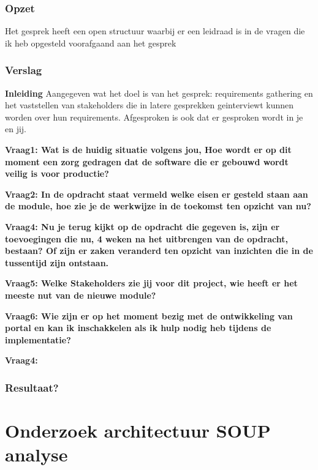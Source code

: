 \subsubsection{Opzet}
Het gesprek heeft een open structuur waarbij er een leidraad is in de vragen die ik heb opgesteld voorafgaand aan het gesprek

\subsubsection{Verslag}
\textbf{Inleiding}
Aangegeven wat het doel is van het gesprek: requirements gathering en het vaststellen van stakeholders die in latere gesprekken geinterviewt kunnen worden over hun requirements. Afgesproken is ook dat er gesproken wordt in je en jij.

\bigskip

\textbf{Vraag1: Wat is de huidig situatie volgens jou, Hoe wordt er op dit moment een zorg gedragen dat de software die er gebouwd wordt veilig is voor productie?}

\lipsum[01]
\bigskip

\textbf{Vraag2: In de opdracht staat vermeld welke eisen er gesteld staan aan de module, hoe zie je de werkwijze in de toekomst ten opzicht van nu?}

\lipsum[03]
\bigskip

\textbf{Vraag4: Nu je terug kijkt op de opdracht die gegeven is, zijn er toevoegingen die nu, 4 weken na het uitbrengen van de opdracht, bestaan? Of zijn er zaken veranderd ten opzicht van inzichten die in de tussentijd zijn ontstaan.}

\lipsum[05]
\bigskip

\textbf{Vraag5: Welke Stakeholders zie jij voor dit project, wie heeft er het meeste nut van de nieuwe module? }

\lipsum[06]
\bigskip

\textbf{Vraag6: Wie zijn er op het moment bezig met de ontwikkeling van portal en kan ik inschakkelen als ik hulp nodig heb tijdens de implementatie?}

\lipsum[09]
\bigskip

\textbf{Vraag4: }

\lipsum[07]

\subsubsection{Resultaat?}

\section{Onderzoek architectuur SOUP analyse}
